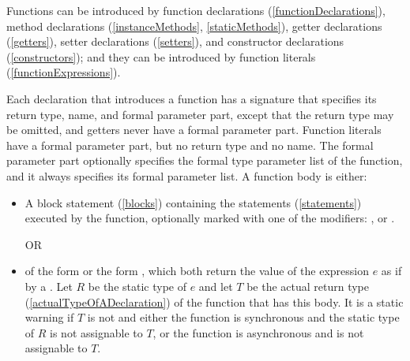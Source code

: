 \documentclass{article}
\begin{document}
\LMHash{}
Functions can be introduced by function declarations (\ref{functionDeclarations}),
method declarations (\ref{instanceMethods}, \ref{staticMethods}),
getter declarations (\ref{getters}),
setter declarations (\ref{setters}),
and constructor declarations (\ref{constructors});
and they can be introduced by function literals (\ref{functionExpressions}).

\LMHash{}
Each declaration that introduces a function has a signature that specifies its return type, name, and formal parameter part,
except that the return type may be omitted, and getters never have a formal parameter part.
Function literals have a formal parameter part, but no return type and no name.
The formal parameter part optionally specifies the formal type parameter list of the function,
and it always specifies its formal parameter list.
A function body is either:
\begin{itemize}
\item A block statement (\ref{blocks}) containing the statements (\ref{statements}) executed by the function, optionally marked with one of the modifiers: \ASYNC, \ASYNC* or \SYNC*.


OR
\item of the form  or the form , which both return the value of the expression $e$ as if by a .
Let $R$ be the static type of $e$
and let $T$ be the actual return type (\ref{actualTypeOfADeclaration})
of the function that has this body.
It is a static warning if $T$ is not \VOID{} and either
the function is synchronous and the static type of $R$ is not assignable to $T$,
or the function is asynchronous and 
is not assignable to $T$.

\end{itemize}
\end{document}
